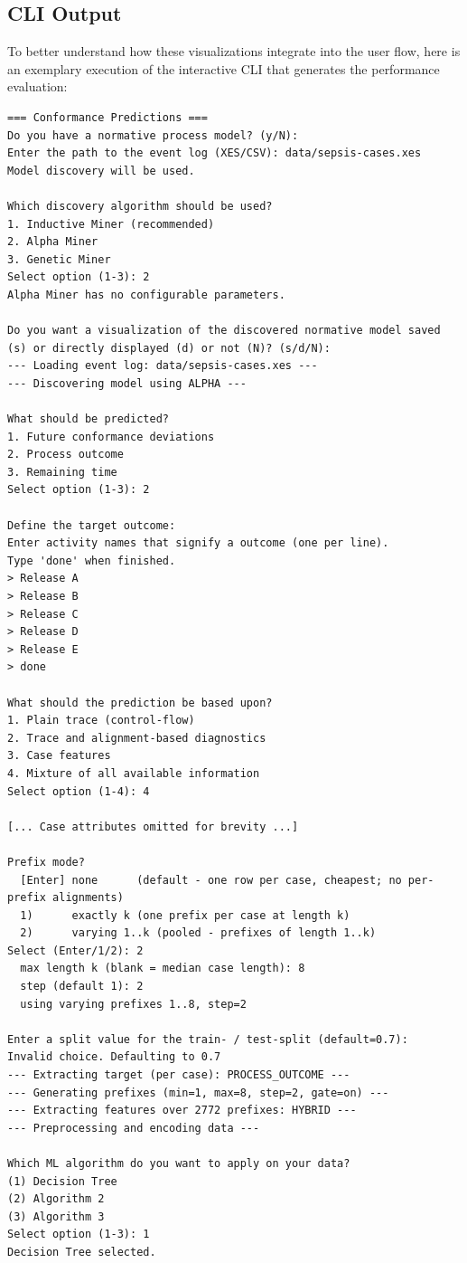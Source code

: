 \documentclass[12pt,a4paper]{article}
\begin{document}
\subsection{CLI Output}
To better understand how these visualizations integrate into the user flow, here is an exemplary execution of the interactive CLI that generates the performance evaluation:

\begin{verbatim}
=== Conformance Predictions ===
Do you have a normative process model? (y/N): 
Enter the path to the event log (XES/CSV): data/sepsis-cases.xes
Model discovery will be used.

Which discovery algorithm should be used?
1. Inductive Miner (recommended)
2. Alpha Miner
3. Genetic Miner
Select option (1-3): 2
Alpha Miner has no configurable parameters.

Do you want a visualization of the discovered normative model saved (s) or directly displayed (d) or not (N)? (s/d/N): 
--- Loading event log: data/sepsis-cases.xes ---
--- Discovering model using ALPHA ---

What should be predicted?
1. Future conformance deviations
2. Process outcome
3. Remaining time
Select option (1-3): 2

Define the target outcome:
Enter activity names that signify a outcome (one per line).
Type 'done' when finished.
> Release A
> Release B
> Release C
> Release D
> Release E
> done

What should the prediction be based upon?
1. Plain trace (control-flow)
2. Trace and alignment-based diagnostics
3. Case features
4. Mixture of all available information
Select option (1-4): 4

[... Case attributes omitted for brevity ...]

Prefix mode?
  [Enter] none      (default - one row per case, cheapest; no per-prefix alignments)
  1)      exactly k (one prefix per case at length k)
  2)      varying 1..k (pooled - prefixes of length 1..k)
Select (Enter/1/2): 2
  max length k (blank = median case length): 8
  step (default 1): 2
  using varying prefixes 1..8, step=2

Enter a split value for the train- / test-split (default=0.7): 
Invalid choice. Defaulting to 0.7
--- Extracting target (per case): PROCESS_OUTCOME ---
--- Generating prefixes (min=1, max=8, step=2, gate=on) ---
--- Extracting features over 2772 prefixes: HYBRID ---
--- Preprocessing and encoding data ---

Which ML algorithm do you want to apply on your data?
(1) Decision Tree
(2) Algorithm 2
(3) Algorithm 3
Select option (1-3): 1
Decision Tree selected.


\end{verbatim}
\end{document}

